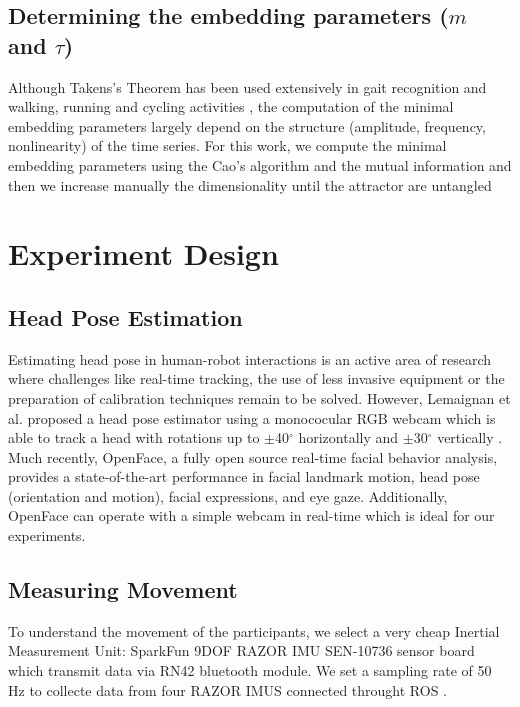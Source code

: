 \documentclass{sigchi}
\begin{document}
\subsection{Determining the embedding parameters ($m$ and $\tau$)}
Although Takens's Theorem has been used extensively in gait
recognition and walking, running and cycling activities \cite{Sama2013},
the computation of the minimal embedding parameters largely depend on the
structure (amplitude, frequency, nonlinearity) of the time series.
For this work, we compute the minimal embedding parameters
using the Cao's algorithm \cite{Cao1997} and the mutual information and then
we increase manually the dimensionality until the attractor are untangled


\section{Experiment Design}

\subsection{Head Pose Estimation}

Estimating head pose in human-robot interactions is an active area of research
where challenges like real-time tracking, the use of less invasive equipment
or the preparation of calibration techniques remain to be solved.
However, Lemaignan et al. proposed a head pose estimator
using a monococular RGB webcam which is able to track a head with rotations up
to $\pm$40$^{\circ}$ horizontally and $\pm$30$^{\circ}$ vertically \cite{Lemaignan2016}.
Much recently, OpenFace, a fully open source real-time facial behavior analysis,
provides a state-of-the-art performance in facial landmark motion,
head pose (orientation and motion), facial expressions, and eye gaze.
Additionally, OpenFace can operate with a simple webcam in real-time \cite{Baltrusaitis2016}
which is ideal for our experiments.


%

\subsection{Measuring Movement}
To understand the movement of the participants, we select a very cheap
Inertial Measurement Unit: SparkFun 9DOF RAZOR IMU SEN-10736 sensor board
which transmit data via RN42 bluetooth module. We set a sampling rate of 50 Hz
to collecte data from four RAZOR IMUS  connected throught ROS \cite{quigley2009}.
\end{document}
